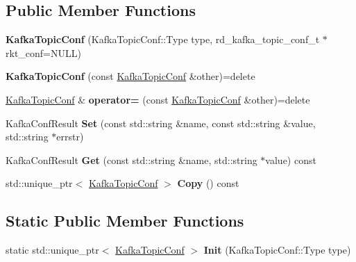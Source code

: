 \subsection*{Public Member Functions}
\begin{DoxyCompactItemize}
\item 
{\bfseries Kafka\+Topic\+Conf} (Kafka\+Topic\+Conf\+::\+Type type, rd\+\_\+kafka\+\_\+topic\+\_\+conf\+\_\+t $\ast$rkt\+\_\+conf=N\+U\+LL)\hypertarget{classlog2hdfs_1_1KafkaTopicConf_a166abb2b9a2b44843c1b64f5ec8bcc2c}{}\label{classlog2hdfs_1_1KafkaTopicConf_a166abb2b9a2b44843c1b64f5ec8bcc2c}

\item 
{\bfseries Kafka\+Topic\+Conf} (const \hyperlink{classlog2hdfs_1_1KafkaTopicConf}{Kafka\+Topic\+Conf} \&other)=delete\hypertarget{classlog2hdfs_1_1KafkaTopicConf_a590a0778cd2f3aa76e31b3527ecd48a1}{}\label{classlog2hdfs_1_1KafkaTopicConf_a590a0778cd2f3aa76e31b3527ecd48a1}

\item 
\hyperlink{classlog2hdfs_1_1KafkaTopicConf}{Kafka\+Topic\+Conf} \& {\bfseries operator=} (const \hyperlink{classlog2hdfs_1_1KafkaTopicConf}{Kafka\+Topic\+Conf} \&other)=delete\hypertarget{classlog2hdfs_1_1KafkaTopicConf_aff28cced1c43f0ed4efd6639ce220f32}{}\label{classlog2hdfs_1_1KafkaTopicConf_aff28cced1c43f0ed4efd6639ce220f32}

\item 
Kafka\+Conf\+Result {\bfseries Set} (const std\+::string \&name, const std\+::string \&value, std\+::string $\ast$errstr)\hypertarget{classlog2hdfs_1_1KafkaTopicConf_afb5c5afa2d824d12f2edae11bbebfaba}{}\label{classlog2hdfs_1_1KafkaTopicConf_afb5c5afa2d824d12f2edae11bbebfaba}

\item 
Kafka\+Conf\+Result {\bfseries Get} (const std\+::string \&name, std\+::string $\ast$value) const \hypertarget{classlog2hdfs_1_1KafkaTopicConf_acd6f86cf119cdffec8661f8b90db48b6}{}\label{classlog2hdfs_1_1KafkaTopicConf_acd6f86cf119cdffec8661f8b90db48b6}

\item 
std\+::unique\+\_\+ptr$<$ \hyperlink{classlog2hdfs_1_1KafkaTopicConf}{Kafka\+Topic\+Conf} $>$ {\bfseries Copy} () const \hypertarget{classlog2hdfs_1_1KafkaTopicConf_ae6d151685c3809e4b5a6aec3c042b3fa}{}\label{classlog2hdfs_1_1KafkaTopicConf_ae6d151685c3809e4b5a6aec3c042b3fa}

\end{DoxyCompactItemize}
\subsection*{Static Public Member Functions}
\begin{DoxyCompactItemize}
\item 
static std\+::unique\+\_\+ptr$<$ \hyperlink{classlog2hdfs_1_1KafkaTopicConf}{Kafka\+Topic\+Conf} $>$ {\bfseries Init} (Kafka\+Topic\+Conf\+::\+Type type)\hypertarget{classlog2hdfs_1_1KafkaTopicConf_aa7c2f76168b0e5ad0d4b16958548c693}{}\label{classlog2hdfs_1_1KafkaTopicConf_aa7c2f76168b0e5ad0d4b16958548c693}

\end{DoxyCompactItemize}
